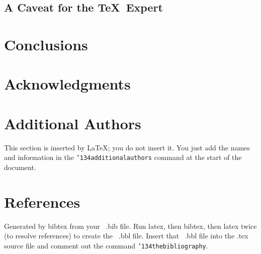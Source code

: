 \subsection*{A Caveat for the \TeX\ Expert}
\section{Conclusions}
\section{Acknowledgments}
\section{Additional Authors}
This section is inserted by \LaTeX; you do not insert it.
You just add the names and information in the
\texttt{{\char'134}additionalauthors} command at the start
of the document.
\section{References}
Generated by bibtex from your ~.bib file.  Run latex,
then bibtex, then latex twice (to resolve references)
to create the ~.bbl file.  Insert that ~.bbl file into
the .tex source file and comment out
the command \texttt{{\char'134}thebibliography}.

